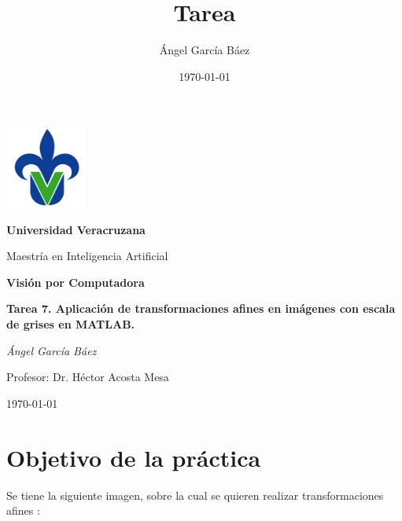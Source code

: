 \documentclass[11pt, letterpaper]{article}
\title{\bfseries Tarea}
\author{Ángel García Báez}
\date{\today}
\begin{document}
	
	\begin{titlepage}
		\centering
		\includegraphics[width=0.2\textwidth]{logo.png}\par
		\vspace{1cm}
		{\LARGE \bfseries Universidad Veracruzana \par}
		\vspace{1cm}
		{\Large Maestría en Inteligencia Artificial\par}
		\vspace{3cm}
		{\LARGE \bfseries Visión por Computadora \par}
		\vspace{1cm}
		{\Large \bfseries Tarea 7. Aplicación de transformaciones afines en imágenes con escala de grises en MATLAB. \par}
		\vfill
		{\Large \textit{Ángel García Báez}\par}
		\vspace{1cm}
		{\Large Profesor: Dr. Héctor Acosta Mesa\par}
		\vfill
		{\Large \today \par}
	\end{titlepage}
	
	\newpage
	\tableofcontents
	\newpage
	
\section{Objetivo de la práctica}

Se tiene la siguiente imagen, sobre la cual se quieren realizar transformaciones afines :
\end{document}
